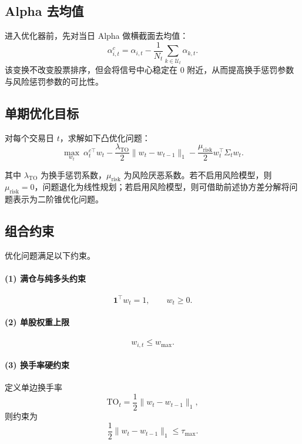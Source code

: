 \documentclass[12pt, a4paper, oneside]{article}
\begin{document}
\subsection{Alpha 去均值}

进入优化器前，先对当日 Alpha 做横截面去均值：
\begin{equation}
\alpha_{i,t}^{c} = \alpha_{i,t} - \frac{1}{N_t}\sum_{k\in\mathcal U_t}\alpha_{k,t}.
\end{equation}
该变换不改变股票排序，但会将信号中心稳定在 0 附近，从而提高换手惩罚参数与风险惩罚参数的可比性。

\subsection{单期优化目标}

对每个交易日 \(t\)，求解如下凸优化问题：
\begin{equation}
\max_{w_t}\ \alpha_t^{c\top}w_t - \frac{\lambda_{\mathrm{TO}}}{2}\|w_t - w_{t-1}\|_1 - \frac{\mu_{\mathrm{risk}}}{2}w_t^\top\Sigma_t w_t.
\end{equation}

其中 \(\lambda_{\mathrm{TO}}\) 为换手惩罚系数，\(\mu_{\mathrm{risk}}\) 为风险厌恶系数。若不启用风险模型，则 \(\mu_{\mathrm{risk}}=0\)，问题退化为线性规划；若启用风险模型，则可借助前述协方差分解将问题表示为二阶锥优化问题。

\subsection{组合约束}

优化问题满足以下约束。

\paragraph{(1) 满仓与纯多头约束}
\begin{equation}
\mathbf 1^\top w_t = 1, \qquad w_t \ge 0.
\end{equation}

\paragraph{(2) 单股权重上限}
\begin{equation}
w_{i,t} \le w_{\max}.
\end{equation}

\paragraph{(3) 换手率硬约束}
定义单边换手率
\begin{equation}
\mathrm{TO}_t = \frac{1}{2}\|w_t - w_{t-1}\|_1,
\end{equation}
则约束为
\begin{equation}
\frac{1}{2}\|w_t - w_{t-1}\|_1 \le \tau_{\max}.
\end{equation}
\end{document}
